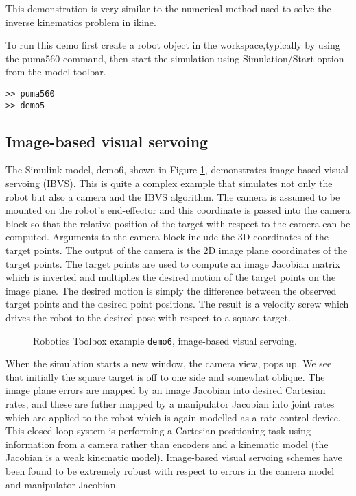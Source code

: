 \documentclass{article}
\newcommand{\var}[1]{{\vtt #1}}
\begin{document}
This demonstration is very similar to the numerical method used to solve
the inverse kinematics problem in \var{ikine}.

To run this demo first create a robot object in
the workspace,typically by using the \var{puma560} command, then start
the simulation using Simulation/Start option from the model toolbar.
\begin{verbatim}
>> puma560
>> demo5
\end{verbatim}


\subsection{Image-based visual servoing}
The Simulink model, \var{demo6}, shown in Figure \ref{fig:demo6}, demonstrates
image-based visual servoing (IBVS)\cite{Hutchinson96}.
This is quite a complex example that simulates not only the robot but also
a camera and the IBVS algorithm.
The camera is assumed to be mounted on the robot's end-effector and this
coordinate is passed into the camera block so that the relative position of
the target with respect to the camera can be computed.
Arguments to the camera block include the 3D coordinates of the target points.
The output of the camera is the 2D image plane coordinates of the target
points.
The target points are used to compute an image Jacobian matrix which is
inverted and multiplies the desired motion of the target points on the image
plane.
The desired motion is simply the difference between the observed target points
and the desired point positions.
The result is a velocity screw which drives the 
robot to the desired pose with respect to a square target.
\begin{figure}[b]
\caption{Robotics Toolbox example \texttt{demo6}, image-based visual
servoing.}\label{fig:demo6}
\end{figure}

When the simulation starts a new window, the camera view, pops up.  We
see that initially the square target is off to one side and somewhat oblique.
The image plane errors are mapped by an image Jacobian into desired Cartesian
rates, and these are futher mapped by a manipulator Jacobian into joint
rates which are applied to the robot which is again modelled as a rate
control device.  This closed-loop system is performing a Cartesian 
positioning task using information from a camera rather than encoders
and a kinematic model (the Jacobian is a weak kinematic model).  Image-based
visual servoing schemes have been found to be extremely robust with respect to
errors in the camera model and manipulator Jacobian.
\end{document}

